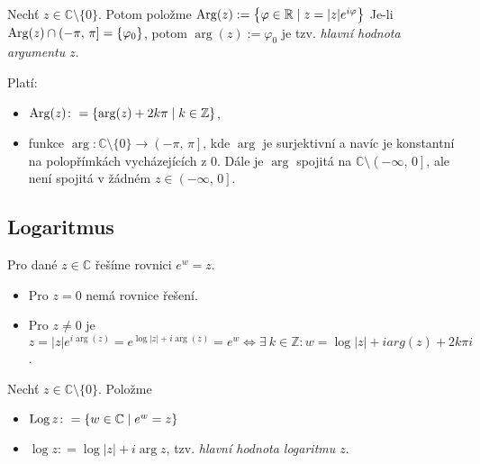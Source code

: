     \begin{notation}
          Nechť $z\in\mathbb{C}\setminus\{0\}$. Potom položme $\operatorname*{Arg}(z):=\left\{\varphi\in\mathbb{R}\mid z=\lvert z \rvert e^{i\varphi}\right\}$ Je-li $\operatorname*{Arg}(z) \cap  (-\pi,\,\pi]=\{\varphi_0\}$, potom $\arg(z):=\varphi_0$ je tzv. \emph{hlavní hodnota argumentu $z$}. %
    \end{notation}
     
         Platí: 
        \begin{itemize}
            \item $\operatorname*{Arg}(z)\colon = \{\arg(z)+2k\pi\mid k\in\mathbb{Z}\}$,
            \item funkce $\arg\colon \mathbb {C}\setminus\{0\} \to \left (-\pi,\,\pi\right ]$, kde $\arg$ je surjektivní a navíc je konstantní na polopřímkách vycházejících z $0$. Dále je $\arg$ spojitá na $\mathbb {C}\setminus\left (-\infty,\,0\right ]$, ale není spojitá v žádném $z\in \left (-\infty,\,0\right ]$.
        \end{itemize}



\subsection{Logaritmus}
Pro dané $z\in\mathbb{C}$ řešíme rovnici $e^w=z$. 
\begin{itemize}
    \item Pro $z=0$ nemá rovnice řešení. \item Pro $z\neq 0$ je $z=\lvert z \rvert e^{i  \arg(z)}=e^{\log\lvert z \rvert+i   \arg(z)}=e^w\iff\exists\ k \in\mathbb{Z}\colon w=\log \lvert z \rvert +i arg(z)+2k\pi i$.
    \end{itemize}

\begin{definition}
Nechť $z\in\mathbb{C}\setminus\{0\}$. Položme 
\begin{itemize}
    \item $\operatorname*{Log} z\colon=\{w\in\mathbb{C}\mid e^w=z\}$
    \item $\log z\colon= \log\lvert z \rvert + i \arg z$,  tzv. \emph{hlavní hodnota logaritmu $z$}.
\end{itemize}
\end{definition}

